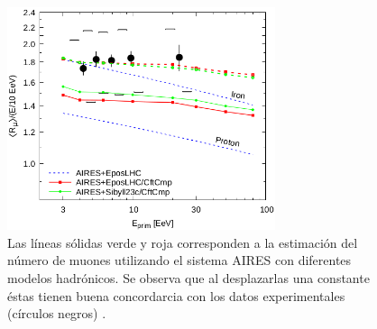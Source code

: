 \begin{figure}[h]
\centering
\includegraphics[width=0.7\textwidth]{Figuras/Nmu_Sciutto} 
\caption{Las líneas sólidas verde y roja corresponden a la estimación del número de muones utilizando el sistema AIRES con diferentes modelos hadrónicos. Se observa que al desplazarlas una constante éstas tienen buena concordarcia con los datos experimentales (círculos negros) \cite{Sciutto2019}.}
\label{fig:Nmu}
\end{figure}	

\singlespace


